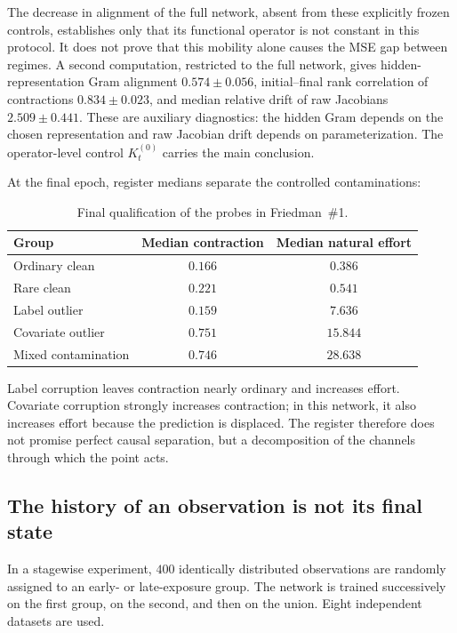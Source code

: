 \documentclass[10pt,a4paper]{article}
\begin{document}
The decrease in alignment of the full network, absent from these explicitly frozen controls, establishes only that its functional operator is not constant in this protocol. It does not prove that this mobility alone causes the MSE gap between regimes. A second computation, restricted to the full network, gives hidden-representation Gram alignment $0.574\pm0.056$, initial--final rank correlation of contractions $0.834\pm0.023$, and median relative drift of raw Jacobians $2.509\pm0.441$. These are auxiliary diagnostics: the hidden Gram depends on the chosen representation and raw Jacobian drift depends on parameterization. The operator-level control $K_t^{(0)}$ carries the main conclusion.

At the final epoch, register medians separate the controlled contaminations:
\begin{table}[H]
\centering
\caption{Final qualification of the probes in Friedman~\#1.}
\label{tab:nonlinear-groups}
\small
\begin{tabular}{@{}lcc@{}}
\toprule
Group & Median contraction & Median natural effort \\
\midrule
Ordinary clean & $0.166$ & $0.386$ \\
Rare clean & $0.221$ & $0.541$ \\
Label outlier & $0.159$ & $7.636$ \\
Covariate outlier & $0.751$ & $15.844$ \\
Mixed contamination & $0.746$ & $28.638$ \\
\bottomrule
\end{tabular}
\end{table}
Label corruption leaves contraction nearly ordinary and increases effort. Covariate corruption strongly increases contraction; in this network, it also increases effort because the prediction is displaced. The register therefore does not promise perfect causal separation, but a decomposition of the channels through which the point acts.

\subsection{The history of an observation is not its final state}
In a stagewise experiment, $400$ identically distributed observations are randomly assigned to an early- or late-exposure group. The network is trained successively on the first group, on the second, and then on the union. Eight independent datasets are used.
\end{document}
